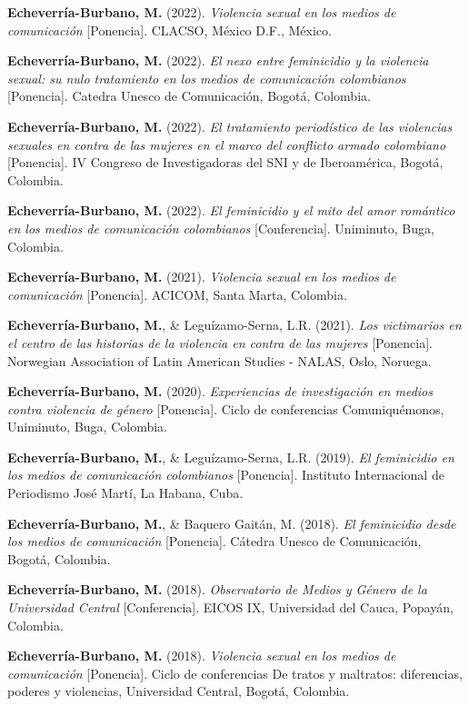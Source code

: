 \documentclass[11pt,a4paper,]{awesome-cv}
\begin{document}
\textbf{Echeverría-Burbano, M.} (2022). \emph{Violencia sexual en los
medios de comunicación} {[}Ponencia{]}. CLACSO, México D.F., México.

\textbf{Echeverría-Burbano, M.} (2022). \emph{El nexo entre feminicidio
y la violencia sexual: su nulo tratamiento en los medios de comunicación
colombianos} {[}Ponencia{]}. Catedra Unesco de Comunicación, Bogotá,
Colombia.

\textbf{Echeverría-Burbano, M.} (2022). \emph{El tratamiento
periodístico de las violencias sexuales en contra de las mujeres en el
marco del conflicto armado colombiano} {[}Ponencia{]}. IV Congreso de
Investigadoras del SNI y de Iberoamérica, Bogotá, Colombia.

\textbf{Echeverría-Burbano, M.} (2022). \emph{El feminicidio y el mito
del amor romántico en los medios de comunicación colombianos}
{[}Conferencia{]}. Uniminuto, Buga, Colombia.

\textbf{Echeverría-Burbano, M.} (2021). \emph{Violencia sexual en los
medios de comunicación} {[}Ponencia{]}. ACICOM, Santa Marta, Colombia.

\textbf{Echeverría-Burbano, M.}, \& Leguízamo-Serna, L.R. (2021).
\emph{Los victimarios en el centro de las historias de la violencia en
contra de las mujeres} {[}Ponencia{]}. Norwegian Association of Latin
American Studies - NALAS, Oslo, Noruega.

\textbf{Echeverría-Burbano, M.} (2020). \emph{Experiencias de
investigación en medios contra violencia de género} {[}Ponencia{]}.
Ciclo de conferencias Comuniquémonos, Uniminuto, Buga, Colombia.

\textbf{Echeverría-Burbano, M.}, \& Leguízamo-Serna, L.R. (2019).
\emph{El feminicidio en los medios de comunicación colombianos}
{[}Ponencia{]}. Instituto Internacional de Periodismo José Martí, La
Habana, Cuba.

\textbf{Echeverría-Burbano, M.}, \& Baquero Gaitán, M. (2018). \emph{El
feminicidio desde los medios de comunicación} {[}Ponencia{]}. Cátedra
Unesco de Comunicación, Bogotá, Colombia.

\textbf{Echeverría-Burbano, M.} (2018). \emph{Observatorio de Medios y
Género de la Universidad Central} {[}Conferencia{]}. EICOS IX,
Universidad del Cauca, Popayán, Colombia.

\textbf{Echeverría-Burbano, M.} (2018). \emph{Violencia sexual en los
medios de comunicación} {[}Ponencia{]}. Ciclo de conferencias De tratos
y maltratos: diferencias, poderes y violencias, Universidad Central,
Bogotá, Colombia.
\end{document}
